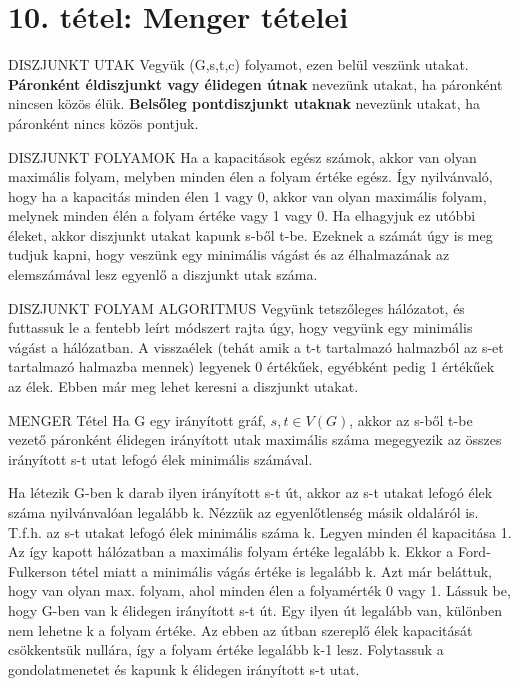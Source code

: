\section{10. tétel: Menger tételei}

\begin{definicio}{DISZJUNKT UTAK}
Vegyük (G,s,t,c) folyamot, ezen belül veszünk utakat. \textbf{Páronként éldiszjunkt vagy élidegen útnak} nevezünk utakat, ha páronként nincsen közös élük. \textbf{Belsőleg pontdiszjunkt utaknak} nevezünk utakat, ha páronként nincs közös pontjuk.
\end{definicio}

\begin{tetel}{DISZJUNKT FOLYAMOK}
Ha a kapacitások egész számok, akkor van olyan maximális folyam, melyben minden élen a folyam értéke egész. Így nyilvánvaló, hogy ha a kapacitás minden élen 1 vagy 0, akkor van olyan maximális folyam, melynek minden élén a folyam értéke vagy 1 vagy 0. Ha elhagyjuk ez utóbbi éleket, akkor diszjunkt utakat kapunk s-ből t-be. Ezeknek a számát úgy is meg tudjuk kapni, hogy veszünk egy minimális vágást és az élhalmazának az elemszámával lesz egyenlő a diszjunkt utak száma.
\end{tetel}

\begin{tetel}{DISZJUNKT FOLYAM ALGORITMUS}
Vegyünk tetszőleges hálózatot, és futtassuk le a fentebb leírt módszert rajta úgy, hogy vegyünk egy minimális vágást a hálózatban. A visszaélek (tehát amik a t-t tartalmazó halmazból az s-et tartalmazó halmazba mennek) legyenek 0 értékűek, egyébként pedig 1 értékűek az élek. Ebben már meg lehet keresni a diszjunkt utakat.
\end{tetel}

\begin{tetel}{MENGER Tétel}
Ha G egy irányított gráf, $s,t\in V(G)$, akkor az s-ből t-be vezető páronként élidegen irányított utak maximális száma megegyezik az összes irányított s-t utat lefogó élek minimális számával.
\end{tetel}

\begin{bizonyitas}{}
Ha létezik G-ben k darab ilyen irányított s-t út, akkor az s-t utakat lefogó élek száma nyilvánvalóan legalább k. Nézzük az egyenlőtlenség másik oldaláról is. T.f.h. az s-t utakat lefogó élek minimális száma k. Legyen minden él kapacitása 1. Az így kapott hálózatban a maximális folyam értéke legalább k. Ekkor a Ford-Fulkerson tétel miatt a minimális vágás értéke is legalább k. Azt már beláttuk, hogy van olyan max. folyam, ahol minden élen a folyamérték 0 vagy 1. Lássuk be, hogy G-ben van k élidegen irányított s-t út. Egy ilyen út legalább van, különben nem lehetne k a folyam értéke. Az ebben az útban szereplő élek kapacitását csökkentsük nullára, így a folyam értéke legalább k-1 lesz. Folytassuk a gondolatmenetet és kapunk k élidegen irányított s-t utat.
\end{bizonyitas}

